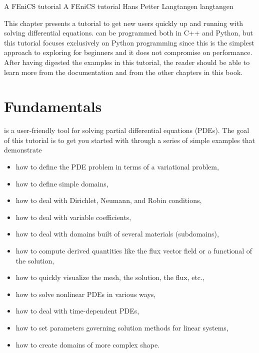 \begingroup

              {A FEniCS tutorial}
              {A FEniCS tutorial}
              {Hans Petter Langtangen}
              {langtangen}

This chapter presents a \fenics{} tutorial to get new users quickly up and
running with solving differential equations. \fenics{} can be programmed
both in C++ and Python, but this tutorial focuses exclusively on Python
programming since this is the simplest approach to exploring \fenics{} for
beginners and it does not compromise on performance. After having digested
the examples in this tutorial, the reader should be able to learn more
from the \fenics{} documentation and from the other chapters in this book.


\section{Fundamentals}
\label{langtangen:fundamentals}

\fenics{} is a user-friendly tool for solving partial differential
equations (PDEs). The goal of this tutorial is to get you started with
\fenics{} through a series of simple examples that demonstrate
\begin{itemize}
  \item how to define the PDE problem in terms of a variational problem,

  \item how to define simple domains,

  \item how to deal with Dirichlet, Neumann, and Robin conditions,

  \item how to deal with variable coefficients,

  \item how to deal with domains built of several materials (subdomains),

  \item how to compute derived quantities like the flux vector field or
  a functional of the solution,

  \item how to quickly visualize the mesh, the solution, the flux, etc.,

  \item how to solve nonlinear PDEs in various ways,

  \item how to deal with time-dependent PDEs,

  \item how to set parameters governing solution methods for linear
  systems,

  \item how to create domains of more complex shape.
\end{itemize}

